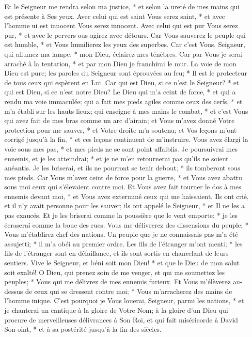 Et le Seigneur me rendra selon ma justice, * et selon la ureté de mes mains qui est présente à Ses yeux.
Avec celui qui est saint Vous serez saint, * et avec l'homme ui est innocent Vous serez innocent.
Avec celui qui est pur Vous serez pur, * et avec le pervers ous agirez avec détours.
Car Vous sauverez le peuple qui est humble, * et Vous humilierez les yeux des superbes.
Car c'est Vous, Seigneur, qui allumez ma lampe; * mon Dieu, éclairez mes ténèbres.
Car par Vous je serai arraché à la tentation, * et par mon Dieu je franchirai le mur.
La voie de mon Dieu est pure; les paroles du Seigneur sont éprouvées au feu; * Il est le protecteur de tous ceux qui espèrent en Lui.
Car qui est Dieu, si ce n'est le Seigneur? * et qui est Dieu, si ce n'est notre Dieu?
Le Dieu qui m'a ceint de force, * et qui a rendu ma voie immaculée;
qui a fait mes pieds agiles comme ceux des cerfs, * et m'a établi sur les hauts lieux;
qui enseigne à mes mains le combat, * et c'est Vous qui avez fait de mes bras comme un arc d'airain;
et Vous m'avez donné Votre protection pour me sauver, * et Votre droite m'a soutenu; et Vos leçons m'ont corrigé jusqu'à la fin, * et ces leçons continuent de m'instruire.
Vous avez élargi la voie sous mes pas, * et mes pieds ne se sont point affaiblis.
Je poursuivrai mes ennemis, et je les atteindrai; * et je ne m'en retournerai pas qu'ils ne soient anéantis.
Je les briserai, et ils ne pourront se tenir debout; * ils tomberont sous mes pieds.
Car Vous m'avez ceint de force pour la guerre, * et Vous avez abattu sous moi ceux qui s'élevaient contre moi.
Et Vous avez fait tourner le dos à mes ennemis devant moi, * et Vous avez exterminé ceux qui me haïssaient.
Ils ont crié, et il n'y avait personne pour les sauver; ils ont appelé le Seigneur, * et Il ne les a pas exaucés.
Et je les briserai comme la poussière que le vent emporte; * je les écraserai comme la boue des rues.
Vous me délivrerez des dissensions du peuple; * Vous m'établirez chef des nations.
Un peuple que je ne connaissais pas m'a été assujetti; * il m'a obéi au premier ordre.
Les fils de l'étranger m'ont menti; * les fils de l'étranger sont en défaillance, et ils sont sortis en chancelant de leurs sentiers.
Vive le Seigneur, et béni soit mon Dieu! * et que le Dieu de mon salut soit exalté!
O Dieu, qui prenez soin de me venger, et qui me soumettez les peuples; * Vous qui me délivrez de mes ennemis furieux.
Et Vous m'élèverez au-dessus de ceux qui se dressent contre moi; * Vous m'arracherez des mains de l'homme inique.
C'est pourquoi je Vous louerai, Seigneur, parmi les nations, * et je chanterai un cantique à la gloire de Votre Nom;
à la gloire d'un Dieu qui procure de merveilleuses délivrances à Son Roi, et qui fait miséricorde à David Son oint, * et à sa postérité jusqu'à la fin des siècles.

